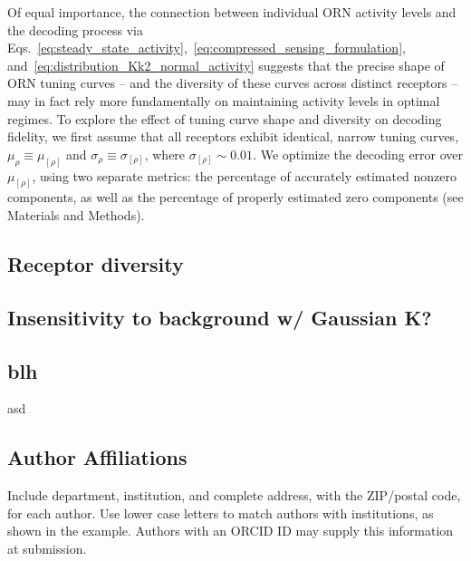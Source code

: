 \documentclass[9pt,twocolumn,twoside]{pnas-new}
\begin{document}
Of equal importance, the connection between individual ORN activity levels and the decoding process via Eqs.~\ref{eq:steady_state_activity},~\ref{eq:compressed_sensing_formulation}, and~\ref{eq:distribution_Kk2_normal_activity} suggests that the precise shape of ORN tuning curves -- and the diversity of these curves across distinct receptors -- may in fact rely more fundamentally on maintaining activity levels in optimal regimes. To explore the effect of tuning curve shape and diversity on decoding fidelity, we first assume that all receptors exhibit identical, narrow tuning curves, $\mu_\rho \equiv \mu_{[\rho]}$ and $\sigma_\rho \equiv \sigma_{[\rho]}$, where $\sigma_{[\rho]}\sim 0.01$. We optimize the decoding error over $\mu_{[\rho]}$, using two separate metrics: the percentage of accurately estimated nonzero components, as well as the percentage of properly estimated zero components (see Materials and Methods). 



\subsection*{Receptor diversity }

\subsection*{Insensitivity to background w/ Gaussian K?}





\subsection*{blh}

asd
\subsection*{Author Affiliations}

Include department, institution, and complete address, with the ZIP/postal code, for each author. Use lower case letters to match authors with institutions, as shown in the example. Authors with an ORCID ID may supply this information at submission.
\end{document}
